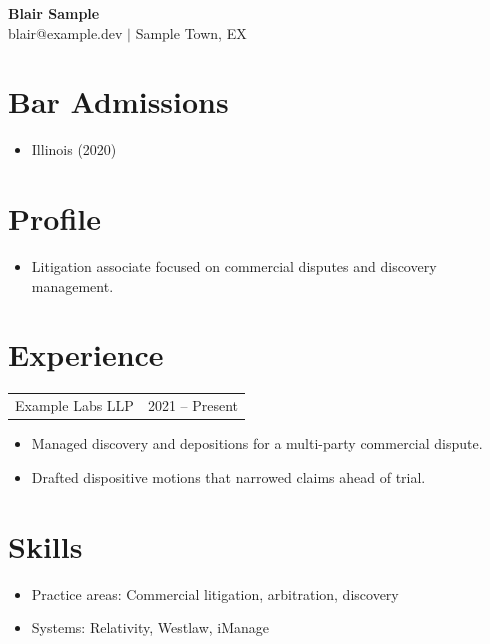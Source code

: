 \documentclass[11pt]{article}
\begin{document}
\begin{center}
  {\Large\bfseries Blair Sample}\\
  blair@example.dev $|$ Sample Town, EX
\end{center}

\section*{Bar Admissions}
\begin{itemize}[leftmargin=*]
  \item Illinois (2020)
\end{itemize}

\section*{Profile}
\begin{itemize}[leftmargin=*]
  \item Litigation associate focused on commercial disputes and discovery management.
\end{itemize}

\section*{Experience}
\begin{tabularx}{\textwidth}{@{}X r@{}}
  Example Labs LLP & 2021 -- Present \\
\end{tabularx}
\begin{itemize}[leftmargin=*]
  \item Managed discovery and depositions for a multi-party commercial dispute.
  \item Drafted dispositive motions that narrowed claims ahead of trial.
\end{itemize}

\section*{Skills}
\begin{itemize}[leftmargin=*]
  \item Practice areas: Commercial litigation, arbitration, discovery
  \item Systems: Relativity, Westlaw, iManage
\end{itemize}
\end{document}
